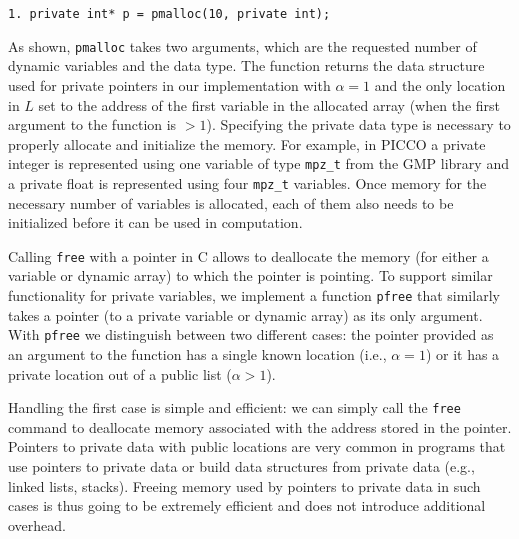 \documentclass[11pt]{article}
\begin{document}
{\small \begin{verbatim}
1. private int* p = pmalloc(10, private int);
\end{verbatim}}
\noindent As shown, \texttt{pmalloc} takes two arguments,
which are the requested number of dynamic variables and the data type. The
function returns the data structure used for private pointers in our
implementation with $\alpha = 1$ and the only location in $L$ set to the
address of the first variable in the allocated array (when the first
argument to the function is $>1$). Specifying the private data type is
necessary to properly allocate and initialize the memory. For example, in
PICCO a private integer is represented using one variable of type
\texttt{mpz\_t} from the GMP library \cite{gmp} and a private float is
represented using four \texttt{mpz\_t} variables. Once memory for the
necessary number of variables is allocated, each of them also needs to be
initialized before it can be used in computation.

Calling \texttt{free} with a pointer in C allows to deallocate the memory
(for either a variable or dynamic array) to which the pointer is pointing.
To support similar functionality for private variables, we implement a
function \texttt{pfree} that similarly takes a pointer (to a private
variable or dynamic array) as its only argument. With \texttt{pfree} we
distinguish between two different cases: the pointer provided as an argument
to the function has a single known location (i.e., $\alpha = 1$) or it has a
private location out of a public list ($\alpha > 1$).

Handling the first case is simple and efficient: we can simply call the
\texttt{free} command to deallocate memory associated with the address
stored in the pointer. Pointers to private data with public locations are
very common in programs that use pointers to private data or build data
structures from private data (e.g., linked lists, stacks). Freeing memory
used by pointers to private data in such cases is thus going to be extremely
efficient and does not introduce additional overhead. 
\end{document}
